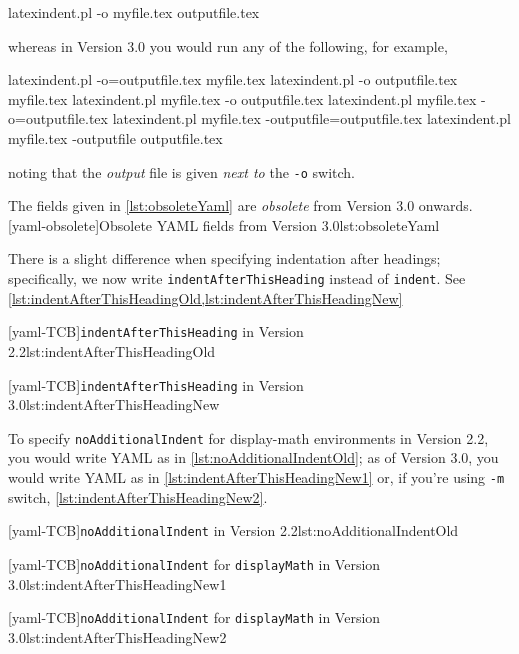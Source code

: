   \begin{commandshell}
latexindent.pl -o myfile.tex outputfile.tex
\end{commandshell}

  whereas in Version 3.0 you would run any of the following, for example,

  \begin{commandshell}
latexindent.pl -o=outputfile.tex myfile.tex
latexindent.pl -o outputfile.tex myfile.tex
latexindent.pl myfile.tex -o outputfile.tex
latexindent.pl myfile.tex -o=outputfile.tex
latexindent.pl myfile.tex -outputfile=outputfile.tex
latexindent.pl myfile.tex -outputfile outputfile.tex
\end{commandshell}

  noting that the \emph{output} file is given \emph{next to} the \texttt{-o} switch.

  The fields given in \cref{lst:obsoleteYaml} are \emph{obsolete} from Version 3.0 onwards.
  [yaml-obsolete]{Obsolete YAML fields from Version 3.0}{lst:obsoleteYaml}

  There is a slight difference when specifying indentation after headings; specifically, we
  now write \texttt{indentAfterThisHeading} instead of \texttt{indent}. See
  \cref{lst:indentAfterThisHeadingOld,lst:indentAfterThisHeadingNew}

  \begin{minipage}{.45\textwidth}
   [yaml-TCB]{\texttt{indentAfterThisHeading} in Version 2.2}{lst:indentAfterThisHeadingOld}
  \end{minipage}%
  \hfill
  \begin{minipage}{.45\textwidth}
   [yaml-TCB]{\texttt{indentAfterThisHeading} in Version 3.0}{lst:indentAfterThisHeadingNew}
  \end{minipage}%

  To specify \texttt{noAdditionalIndent} for display-math environments in Version 2.2, you
  would write YAML as in \cref{lst:noAdditionalIndentOld}; as of Version 3.0, you would
  write YAML as in \cref{lst:indentAfterThisHeadingNew1} or, if you're using \texttt{-m}
  switch, \cref{lst:indentAfterThisHeadingNew2}. 

  \begin{minipage}{.45\textwidth}
   [yaml-TCB]{\texttt{noAdditionalIndent} in Version 2.2}{lst:noAdditionalIndentOld}
  \end{minipage}%
  \hfill
  \begin{minipage}{.45\textwidth}
   [yaml-TCB]{\texttt{noAdditionalIndent} for \texttt{displayMath} in Version 3.0}{lst:indentAfterThisHeadingNew1}

   [yaml-TCB]{\texttt{noAdditionalIndent} for \texttt{displayMath} in Version 3.0}{lst:indentAfterThisHeadingNew2}
  \end{minipage}%

